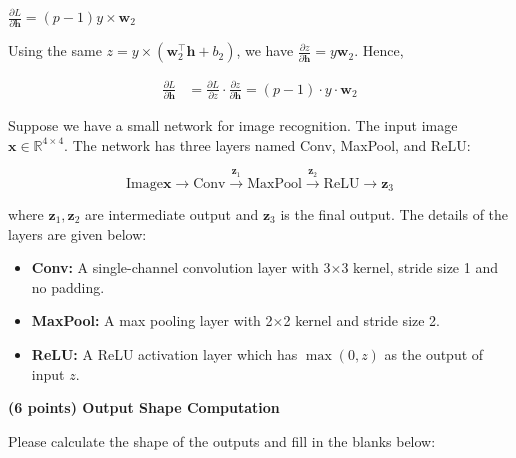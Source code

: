 \documentclass{article}
\newcommand{\R}{\mathbb{R}}
\newcommand{\x}{\mathbf{x}}
\newcommand{\w}{\mathbf{w}}
\newcommand{\h}{\mathbf{h}}
\newcommand{\z}{\mathbf{z}}
\begin{document}
\begin{probset}
\begin{prob}
\begin{subprobset}
    \begin{subprob}
        $\displaystyle\frac{\partial L}{\partial \h} = (p - 1) y \times \w_2$

        \begin{soln}
            Using the same $z = y \times (\w_2^\top \h + b_2)$, we have $\frac{\partial z}{\partial \h} = y\w_2$. Hence,

            \begin{align*}
                \frac{\partial L}{\partial \h}
                &= \frac{\partial L}{\partial z} \cdot \frac{\partial z}{\partial \h}
                = (p - 1) \cdot y \cdot \w_2
            \end{align*}
        \end{soln}
    \end{subprob}
    \end{subprobset}
\end{prob}

\newpage

\begin{prob}
    Suppose we have a small network for image recognition. The input image $\x \in \R^{4 \times 4}$. The network has three layers named Conv, MaxPool, and ReLU:

    \[ \text{Image} \x \to \text{Conv} \xrightarrow{\z_1} \text{MaxPool} \xrightarrow{\z_2} \text{ReLU} \rightarrow \z_3 \]
    
    where $\z_1, \z_2$ are intermediate output and $\z_3$ is the final output. The details of the layers are given below:
    \begin{itemize}[label={}]
        \item \textbf{Conv:} A single-channel convolution layer with 3$\times$3 kernel, stride size 1 and no padding.
        \item \textbf{MaxPool:} A max pooling layer with 2$\times$2 kernel and stride size 2.
        \item \textbf{ReLU:} A ReLU activation layer which has $\max(0, z)$ as the output of input $z$.
    \end{itemize}

    \begin{subprobset}
        \begin{subprob}
            \textbf{(6 points) Output Shape Computation}

            Please calculate the shape of the outputs and fill in the blanks below:


\end{subprob}
\end{subprobset}
\end{prob}
\end{probset}
\end{document}

